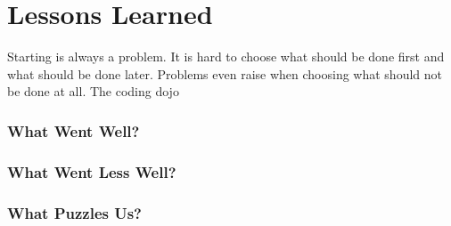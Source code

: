 \section{Lessons Learned}\label{sec:lessons_learned}

Starting is always a problem. It is hard to choose what should be done
first and what should be done later. Problems even raise when choosing
what should not be done at all. The coding dojo 

\subsubsection{What Went Well?}\label{ssub:well}

\subsubsection{What Went Less Well?}\label{ssub:less_well}

\subsubsection{What Puzzles Us?}\label{ssub:puzzles}
